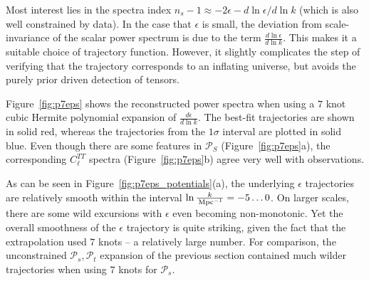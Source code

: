 \documentclass[a4paper,11pt]{article}
\def\mpc{{\rm\,Mpc}}
\newcommand{\mc}[1]{{\mathcal{#1}}}
\def\mpc{{\rm\,Mpc}}
\newcommand{\pscalar}{{\mathcal{P}_s}}
\newcommand{\ptensor}{{\mathcal{P}_t}}
\begin{document}
Most interest lies in the spectra index
$n_s-1\approx-2\epsilon-d\ln\epsilon/d\ln k$ (which is also well
constrained by data). In the case that $\epsilon$ is small, the
deviation from scale-invariance of the scalar power spectrum is due to
the term $\frac{d\ln\epsilon}{d\ln k}$. This makes it a suitable
choice of trajectory function. However, it slightly complicates the
step of verifying that the trajectory corresponds to an inflating
universe, but avoids the purely prior driven detection of tensors.

Figure~\ref{fig:p7eps} shows the reconstructed power spectra when
using a $7$ knot cubic Hermite polynomial expansion of
$\frac{d\epsilon}{d\ln k}$. The best-fit trajectories are shown in
solid red, whereas the trajectories from the $1\sigma$ interval are
plotted in solid blue. Even though there are some features in
$\mc{P}_S$ (Figure~\ref{fig:p7eps}a), the corresponding
$C_{\ell}^{TT}$ spectra (Figure~\ref{fig:p7eps}b) agree very well with
observations. 

As can be seen in Figure~\ref{fig:p7eps_potentials}(a), the underlying
$\epsilon$ trajectories are relatively smooth within the interval $\ln
\frac{k}{\mpc^{-1}}=-5\dots0$. On larger scales, there are some wild
excursions with $\epsilon$ even becoming non-monotonic. Yet the
overall smoothness of the $\epsilon$ trajectory is quite striking,
given the fact that the extrapolation used $7$ knots -- a relatively
large number. For comparison, the unconstrained $\pscalar, \ptensor$
expansion of the previous section contained much wilder trajectories
when using $7$ knots for $\pscalar$.
\end{document}
